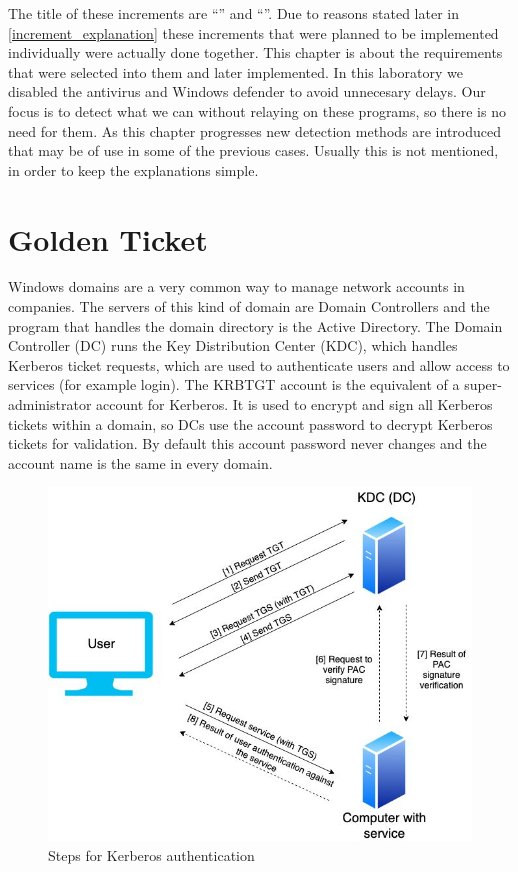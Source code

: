 The title of these increments are ``\IncrementoUno'' and ``\IncrementoDos''. Due to reasons stated later in \ref{increment_explanation} these increments that were planned to be implemented individually were actually done together.
This chapter is about the requirements that were selected into them and later implemented.
\linej
\linej
In this laboratory we disabled the antivirus and Windows defender to avoid unnecesary delays. Our focus is to detect what we can without relaying on these programs, so there is no need for them.
\linej
\linej
As this chapter progresses new detection methods are introduced that may be of use in some of the previous cases.
Usually this is not mentioned, in order to keep the explanations simple.

\section{Golden Ticket}
Windows domains are a very common way to manage network accounts in companies. The servers of this kind of domain are Domain Controllers and the program that handles the domain directory is the Active Directory. The Domain Controller (DC) runs the Key Distribution Center (KDC), which handles Kerberos ticket requests, which are used to authenticate users and allow access to services (for example login).
\linej
The KRBTGT account is the equivalent of a super-administrator account for Kerberos. It is used to encrypt and sign all Kerberos tickets within a domain, so DCs use the account password to decrypt Kerberos tickets for validation.
By default this account password never changes and the account name is the same in every domain\cite{stealthbits}.
\linej
\begin{figure}[H]
	\label{kerberos_exchange}
	\centering
	\includegraphics[width=.8\textwidth]{figuras/TGT_TGS_PAC.jpg}
	\caption{Steps for Kerberos authentication}
\end{figure}
